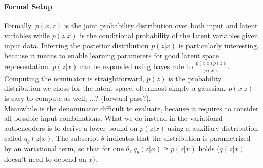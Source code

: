 \paragraph{Formal Setup}
Formally, $p(x,z)$ is the joint probability distribution over both input and latent variables while $p(z|x)$ is the conditional probability of the latent variables given input data.
Inferring the posterior distribution $p(z|x)$ is particularly interesting, because it means to enable learning parameters for good latent space representation.
$p(z|x)$ can be expanded using bayes rule to $\frac{p(x|z) p(z)}{p(x)}$.
Computing the nominator is straightforward, $p(z)$ is the probability distribution we chose for the latent space, oftenmost simply a gaussian.
$p(x|z)$ is easy to compute as well, ...? (forward pass?).\\
Meanwhile is the denominator difficult to evaluate, because it requires to consider all possible input combinations.
What we do instead in the variational autoencoders is to derive a lower-bound on $p(z|x)$ using a auxiliary distribution called $q_\theta(z|x)$. The subscript $\theta$ indicates that the distribution is parametrized by an variational term, so that for one $\theta$, $q_\theta(z|x) \approxeq p(z|x)$ holds ($q(z|x)$ doesn't need to depend on $x$).






